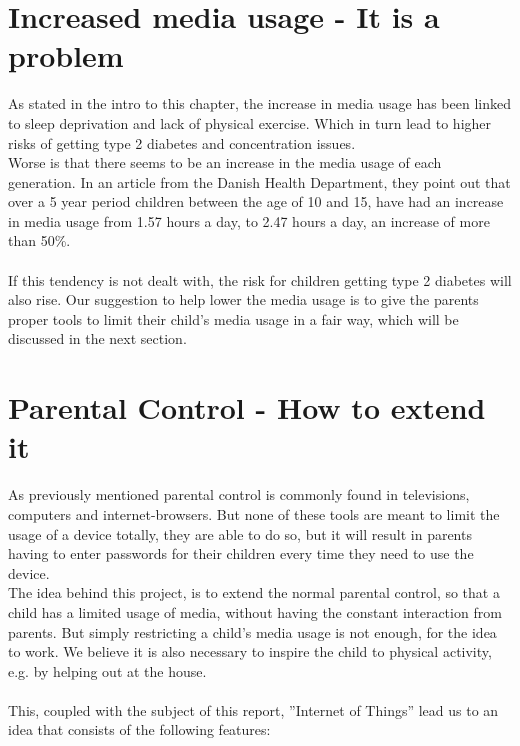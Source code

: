 \section{Increased media usage - It is a problem}
As stated in the intro to this chapter, the increase in media usage has been linked to sleep deprivation and lack of physical exercise. Which in turn lead to higher risks of getting type 2 diabetes and concentration issues.\\
Worse is that there seems to be an increase in the media usage of each generation. In an article from the Danish Health Department, they point out that over a 5 year period children between the age of 10 and 15, have had an increase in media usage from 1.57 hours a day, to 2.47 hours a day, an increase of more than 50\%.\citep{sundhedsstyrelsen}\\
\\
If this tendency is not dealt with, the risk for children getting type 2 diabetes will also rise. Our suggestion to help lower the media usage is to give the parents proper tools to limit their child’s media usage in a fair way, which will be discussed in the next section.


\section{Parental Control - How to extend it}
\label{section:pcHowToExtend}
As previously mentioned parental control is commonly found in televisions, computers and internet-browsers. But none of these tools are meant to limit the usage of a device totally, they are able to do so, but it will result in parents having to enter passwords for their children every time they need to use the device.\\
The idea behind this project, is to extend the normal parental control, so that a child has a limited usage of media, without having the constant interaction from parents. 
But simply restricting a child's media usage is not enough, for the idea to work. We believe it is also necessary to inspire the child to physical activity, e.g. by helping out at the house.\\
\\
This, coupled with the subject of this report, ''Internet of Things'' lead us to an idea that consists of the following features:


